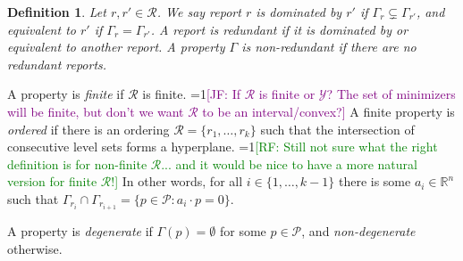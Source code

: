 \documentclass[12pt]{article}
\newcommand{\Comments}{1}
\newcommand{\mynote}[2]{\ifnum\Comments=1\textcolor{#1}{#2}\fi}
\newcommand{\raf}[1]{\mynote{green}{[RF: #1]}}
\newcommand{\jessie}[1]{\mynote{purple}{[JF: #1]}}
\newcommand{\reals}{\mathbb{R}}
\renewcommand{\P}{\mathcal{P}}
\newcommand{\R}{\mathcal{R}}
\newcommand{\Y}{\mathcal{Y}}
\renewcommand{\P}{\mathcal{P}}
\newtheorem{definition}{Definition}
\begin{document}
\begin{definition}
  Let $r,r'\in\R$.
  We say report $r$ is \emph{dominated by $r'$} if $\Gamma_r \subsetneq \Gamma_{r'}$, and \emph{equivalent to $r'$} if $\Gamma_r = \Gamma_{r'}$.
  A report is \emph{redundant} if it is dominated by or equivalent to another report.
  A property $\Gamma$ is \emph{non-redundant} if there are no redundant reports.
\end{definition}

A property is \emph{finite} if $\R$ is finite.
\jessie{If $\R$ is finite or $\Y$?  The set of minimizers will be finite, but don't we want $\R$ to be an interval/convex?}
A finite property is \emph{ordered} if there is an ordering $\R = \{r_1,\ldots,r_k\}$ such that the intersection of consecutive level sets forms a hyperplane.
\raf{Still not sure what the right definition is for non-finite $\R$... and it would be nice to have a more natural version for finite $\R$!}
In other words, for all $i \in \{1,\ldots,k-1\}$ there is some $a_i\in\reals^n$ such that $\Gamma_{r_i}\cap\Gamma_{r_{i+1}} = \{p\in\P : a_i\cdot p = 0\}$.

A property is \emph{degenerate} if $\Gamma(p) = \emptyset$ for some $p\in\P$, and \emph{non-degenerate} otherwise.
\end{document}
